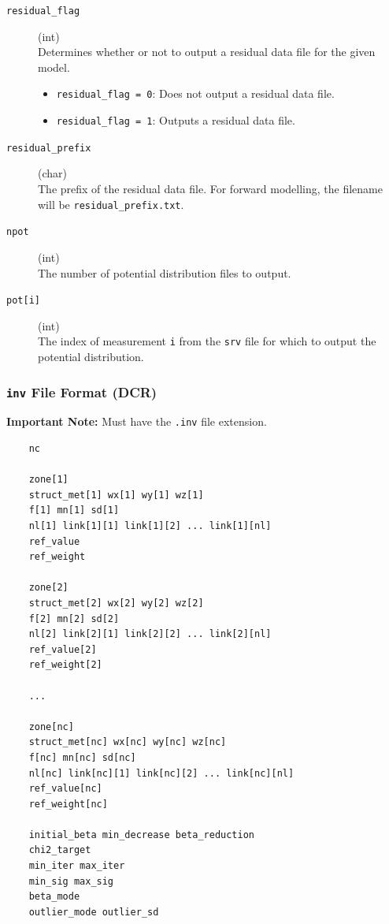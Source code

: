 \documentclass[a4paper,12pt]{article}
\begin{document}
\begin{description}
    \item[\texttt{residual\_flag}] (int)\hfill \\
    Determines whether or not to output a residual data file for the given model.
    \begin{itemize}
        \item \texttt{residual\_flag = 0}: Does not output a residual data file.
        \item \texttt{residual\_flag = 1}: Outputs a residual data file.
    \end{itemize}
    
    \item[\texttt{residual\_prefix}] (char)\hfill \\
    The prefix of the residual data file. For forward modelling, the filename will be \texttt{residual\_prefix.txt}.
    
    \item[\texttt{npot}] (int)\hfill \\
    The number of potential distribution files to output.

    \item[\texttt{pot[i]}] (int)\hfill \\
    The index of measurement \texttt{i} from the \texttt{srv} file for which to output the potential distribution.
\end{description}


\newpage
\subsubsection{\texttt{inv} File Format (DCR)} \label{inversion_dc}

\begin{framed}
\noindent \textbf{Important Note:} Must have the \texttt{.inv} file extension.
\end{framed}

\begin{framed}
\begin{verbatim}
    nc

    zone[1]
    struct_met[1] wx[1] wy[1] wz[1]
    f[1] mn[1] sd[1]
    nl[1] link[1][1] link[1][2] ... link[1][nl]
    ref_value
    ref_weight

    zone[2]
    struct_met[2] wx[2] wy[2] wz[2]
    f[2] mn[2] sd[2]
    nl[2] link[2][1] link[2][2] ... link[2][nl]
    ref_value[2]
    ref_weight[2]

    ...

    zone[nc]
    struct_met[nc] wx[nc] wy[nc] wz[nc]
    f[nc] mn[nc] sd[nc]
    nl[nc] link[nc][1] link[nc][2] ... link[nc][nl]
    ref_value[nc]
    ref_weight[nc]

    initial_beta min_decrease beta_reduction
    chi2_target
    min_iter max_iter
    min_sig max_sig
    beta_mode
    outlier_mode outlier_sd
\end{verbatim}
\end{framed}
\end{document}
